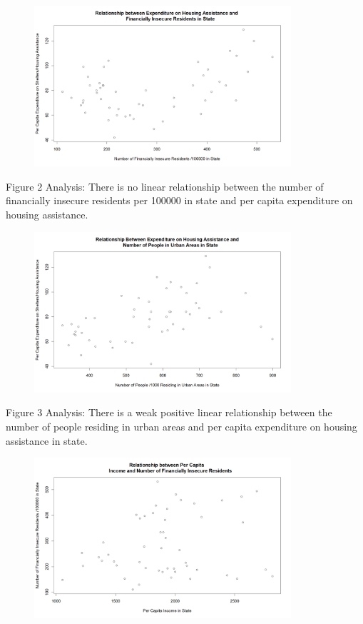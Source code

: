 \documentclass[12pt,letterpaper]{article}
\begin{document}
\begin{itemize}
		\begin{figure}[h!]
			\centering
			\caption{\footnotesize}
			\label{fig:plot_2}
			\includegraphics[width=0.85\textwidth]{Figure1.2}  
		\end{figure}
		\noindent
		Figure 2 Analysis: There is no linear relationship between the number of financially insecure residents per 100000 in state and per capita expenditure on housing assistance.
		\begin{figure}[h!]
			\centering
			\caption{\footnotesize}
			\label{fig:plot_3}
			\includegraphics[width=0.85\textwidth]{Figure1.3}
		\end{figure}
		
		\noindent
		Figure 3 Analysis: There is a weak positive linear relationship between the number of people residing in urban areas and per capita expenditure on housing assistance in state.
		\begin{figure}[h!]
			\centering
			\caption{\footnotesize}
			\label{fig:plot_4}
			\includegraphics[width=0.85\textwidth]{Figure1.4}
		\end{figure}
		

\end{itemize}
\end{document}
